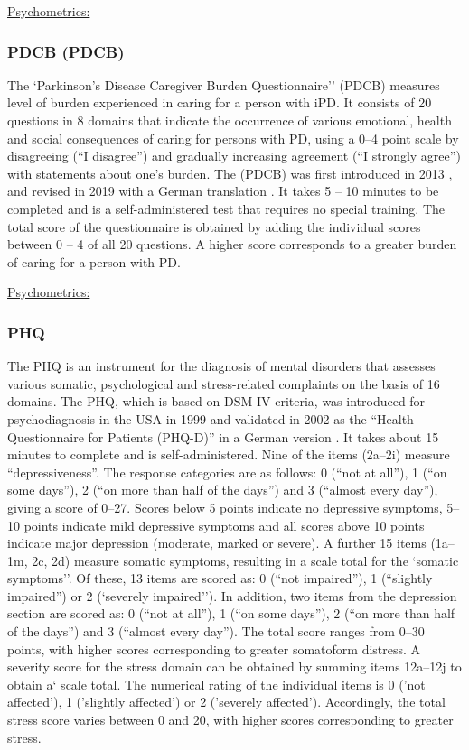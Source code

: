 \underline{Psychometrics:}

\subsubsection{\acl{PDCB} (\acs{PDCB})}
\label{questionnaires:PDCB}
The `Parkinson's Disease Caregiver Burden Questionnaire''  (\acs{PDCB}) measures level of burden experienced in caring for a person with \ac{iPD}. It consists of 20 questions in 8 domains that indicate the occurrence of various emotional, health and social consequences of caring for persons with \ac{PD}, using a 0--4 point scale by disagreeing (``I disagree'') and gradually increasing agreement (``I strongly agree'') with statements about one's burden. The (\acs{PDCB}) was first introduced in 2013 \cite{zhong2013pdcb}, and revised in 2019 with a German translation \cite{klietz2019pdcb}. It takes 5 -- 10 minutes to be completed and is a self-administered test that requires no special training. The total score of the questionnaire is obtained by adding the individual scores between 0 -- 4 of all 20 questions. A higher score corresponds to a greater burden of caring for a person with \ac{PD}.

\underline{Psychometrics:}

\subsubsection{\acl{PHQ}}
\label{questionnaires:PHQ}
The \acs{PHQ} is an instrument for the diagnosis of mental disorders that assesses various somatic, psychological and stress-related complaints on the basis of 16 domains. The \acs{PHQ}, which is based on DSM-IV criteria, was introduced for psychodiagnosis in the USA in 1999 \cite{spitzer1999phq} and validated in 2002 as the ``Health Questionnaire for Patients (PHQ-D)'' in a German version \cite{lowe2002phq}. It takes about 15 minutes to complete and is self-administered. Nine of the items (2a--2i) measure ``depressiveness''. The response categories are as follows: 0 (``not at all''), 1 (``on some days''), 2 (``on more than half of the days'') and 3 (``almost every day''), giving a score of 0--27. Scores below 5 points indicate no depressive symptoms, 5--10 points indicate mild depressive symptoms and all scores above 10 points indicate major depression (moderate, marked or severe). A further 15 items (1a--1m, 2c, 2d) measure somatic symptoms, resulting in a scale total for the `somatic symptoms''. Of these, 13 items are scored as: 0 (``not impaired''), 1 (``slightly impaired'') or 2 (`severely impaired''). In addition, two items from the depression section are scored as: 0 (``not at all''), 1 (``on some days''), 2 (``on more than half of the days'') and 3 (``almost every day''). The total score ranges from 0--30 points, with higher scores corresponding to greater somatoform distress. 
A severity score for the stress domain can be obtained by summing items 12a--12j to obtain a` scale total. The numerical rating of the individual items is 0 ('not affected'), 1 ('slightly affected') or 2 ('severely affected'). Accordingly, the total stress score varies between 0 and 20, with higher scores corresponding to greater stress.

